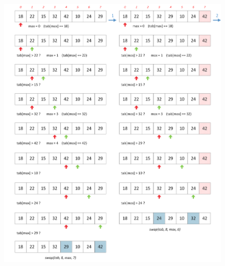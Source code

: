 \documentclass[11pt,a4paper]{article}
\begin{document}
\begin{figure}[ht!]
\centering
\centerline{
\includegraphics[width=1.2\textwidth]{img/tris/2_per_pages/SelectionSort_part1.png}
}
\end{figure}

\vfill


\clearpage

\vfillFirst
\end{document}

